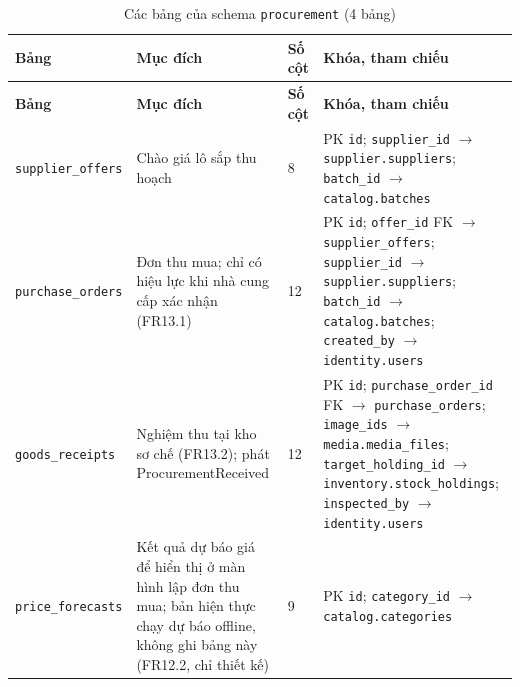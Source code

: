\begingroup
\tblsetup\footnotesize\renewcommand{\arraystretch}{1.1}
\begin{longtable}{L{3.20cm} L{5.60cm} L{1.10cm} L{5.00cm}}
\caption{Các bảng của schema \texttt{procurement} (4 bảng)}
\label{tab:db-procurement} \\
\toprule
{}
\textbf{Bảng} & \textbf{Mục đích} & \textbf{Số cột} & \textbf{Khóa, tham chiếu} \\
\midrule
\endfirsthead
\toprule
{}
\textbf{Bảng} & \textbf{Mục đích} & \textbf{Số cột} & \textbf{Khóa, tham chiếu} \\
\midrule
\endhead
\bottomrule
\endfoot
\texttt{supplier\_\allowbreak{}offers} & Chào giá lô sắp thu hoạch & 8 & PK \texttt{id}; \texttt{supplier\_\allowbreak{}id} $\to$ \texttt{supplier.suppliers}; \texttt{batch\_\allowbreak{}id} $\to$ \texttt{catalog.batches} \\
\texttt{purchase\_\allowbreak{}orders} & Đơn thu mua; chỉ có hiệu lực khi nhà cung cấp xác nhận (FR13.1) & 12 & PK \texttt{id}; \texttt{offer\_\allowbreak{}id} FK $\to$ \texttt{supplier\_\allowbreak{}offers}; \texttt{supplier\_\allowbreak{}id} $\to$ \texttt{supplier.suppliers}; \texttt{batch\_\allowbreak{}id} $\to$ \texttt{catalog.batches}; \texttt{created\_\allowbreak{}by} $\to$ \texttt{identity.users} \\
\texttt{goods\_\allowbreak{}receipts} & Nghiệm thu tại kho sơ chế (FR13.2); phát ProcurementReceived & 12 & PK \texttt{id}; \texttt{purchase\_\allowbreak{}order\_\allowbreak{}id} FK $\to$ \texttt{purchase\_\allowbreak{}orders}; \texttt{image\_\allowbreak{}ids} $\to$ \texttt{media.media\_\allowbreak{}files}; \texttt{target\_\allowbreak{}holding\_\allowbreak{}id} $\to$ \texttt{inventory.stock\_\allowbreak{}holdings}; \texttt{inspected\_\allowbreak{}by} $\to$ \texttt{identity.users} \\
\texttt{price\_\allowbreak{}forecasts} & Kết quả dự báo giá để hiển thị ở màn hình lập đơn thu mua; bản hiện thực chạy dự báo offline, không ghi bảng này (FR12.2, chỉ thiết kế) & 9 & PK \texttt{id}; \texttt{category\_\allowbreak{}id} $\to$ \texttt{catalog.categories} \\
\end{longtable}
\endgroup

